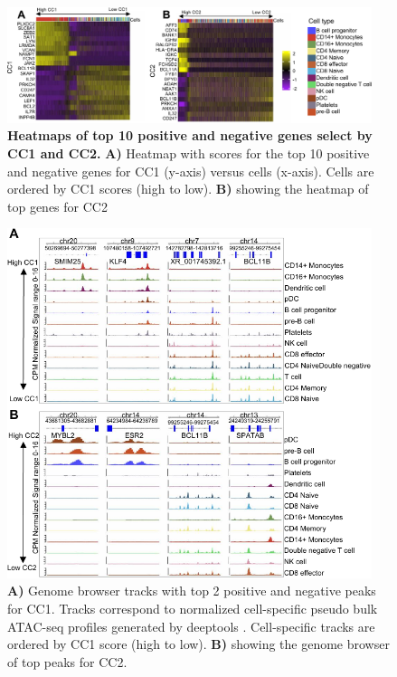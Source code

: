 \begin{figure}[!ht]
	\centering
	\includegraphics[width=0.95\textwidth]{CC_Genes/fig}
	\vspace{0.1cm}
	\caption[Heatmaps of top 10 positive and negative genes select by CC1 and CC2.]{\textbf{Heatmaps of top 10 positive and negative genes select by CC1 and CC2.} \textbf{A)} Heatmap with scores for the top 10 positive and negative genes for CC1 (y-axis) versus cells (x-axis). Cells are ordered by CC1 scores (high to low). \textbf{B)} showing the heatmap of top genes for CC2}
	\label{fig:CC_Genes}
\end{figure}


\begin{figure}[!ht]
	\centering
	\includegraphics[width=0.95\textwidth]{CC_Peaks/fig}
	\vspace{0.1cm}
	\caption[Genome browser tracks of top 2 positive and negative peaks for CC1 and CC2.]{ \textbf{A)} Genome browser tracks with top 2 positive and negative peaks for CC1. Tracks correspond to normalized cell-specific pseudo bulk ATAC-seq profiles generated by deeptools \citep{ramirez2016deeptools2}. Cell-specific tracks are ordered by CC1 score (high to low). \textbf{B)} showing the genome browser of top peaks for CC2.}
	\label{fig:CC_Peaks}
\end{figure}

